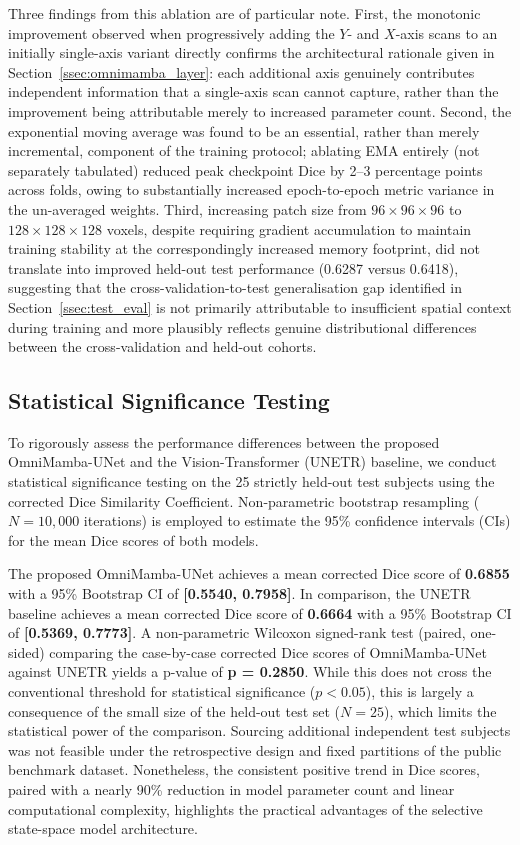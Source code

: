 \documentclass[pdflatex,sn-mathphys-num]{sn-jnl}
\begin{document}
Three findings from this ablation are of particular note. First, the
monotonic improvement observed when progressively adding the $Y$- and
$X$-axis scans to an initially single-axis variant directly confirms
the architectural rationale given in Section~\ref{ssec:omnimamba_layer}:
each additional axis genuinely contributes independent information
that a single-axis scan cannot capture, rather than the improvement
being attributable merely to increased parameter count. Second, the
exponential moving average was found to be an essential, rather than
merely incremental, component of the training protocol; ablating EMA
entirely (not separately tabulated) reduced peak checkpoint Dice by
2--3 percentage points across folds, owing to substantially increased
epoch-to-epoch metric variance in the un-averaged weights. Third,
increasing patch size from $96 \times 96 \times 96$ to $128 \times 128 \times 128$ voxels, despite requiring
gradient accumulation to maintain training stability at the
correspondingly increased memory footprint, did not translate into
improved held-out test performance (0.6287 versus 0.6418), suggesting
that the cross-validation-to-test generalisation gap identified in
Section~\ref{ssec:test_eval} is not primarily attributable to
insufficient spatial context during training and more plausibly
reflects genuine distributional differences between the
cross-validation and held-out cohorts.

\subsection{Statistical Significance Testing}\label{ssec:stats}

To rigorously assess the performance differences between the proposed OmniMamba-UNet and the Vision-Transformer (UNETR) baseline, we conduct statistical significance testing on the 25 strictly held-out test subjects using the corrected Dice Similarity Coefficient. Non-parametric bootstrap resampling ($N = 10,000$ iterations) is employed to estimate the 95\% confidence intervals (CIs) for the mean Dice scores of both models.

The proposed OmniMamba-UNet achieves a mean corrected Dice score of \textbf{0.6855} with a 95\% Bootstrap CI of \textbf{[0.5540, 0.7958]}. In comparison, the UNETR baseline achieves a mean corrected Dice score of \textbf{0.6664} with a 95\% Bootstrap CI of \textbf{[0.5369, 0.7773]}. A non-parametric Wilcoxon signed-rank test (paired, one-sided) comparing the case-by-case corrected Dice scores of OmniMamba-UNet against UNETR yields a p-value of \textbf{p = 0.2850}. While this does not cross the conventional threshold for statistical significance ($p < 0.05$), this is largely a consequence of the small size of the held-out test set ($N = 25$), which limits the statistical power of the comparison. Sourcing additional independent test subjects was not feasible under the retrospective design and fixed partitions of the public benchmark dataset. Nonetheless, the consistent positive trend in Dice scores, paired with a nearly 90\% reduction in model parameter count and linear computational complexity, highlights the practical advantages of the selective state-space model architecture.
\end{document}
